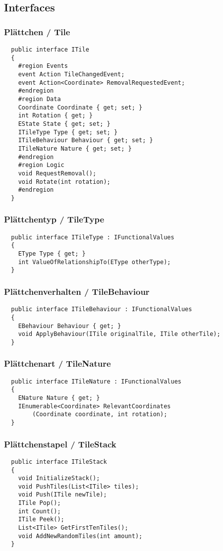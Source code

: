 \documentclass[../main.tex]{subfiles}
\begin{document}
	\subsection{Interfaces}
	\subsubsection{Plättchen / Tile}
	\begin{lstlisting}
  public interface ITile
  {
	#region Events
	event Action TileChangedEvent;
	event Action<Coordinate> RemovalRequestedEvent;
	#endregion
	#region Data
	Coordinate Coordinate { get; set; }
	int Rotation { get; }
	EState State { get; set; }
	ITileType Type { get; set; }
	ITileBehaviour Behaviour { get; set; }
	ITileNature Nature { get; set; }
	#endregion
	#region Logic
	void RequestRemoval();
	void Rotate(int rotation);
	#endregion
  }
	\end{lstlisting}

	\subsubsection{Plättchentyp / TileType}
	\begin{lstlisting}
  public interface ITileType : IFunctionalValues
  {
	EType Type { get; }
	int ValueOfRelationshipTo(EType otherType);
  }
	\end{lstlisting}

	\subsubsection{Plättchenverhalten / TileBehaviour}
	\begin{lstlisting}
  public interface ITileBehaviour : IFunctionalValues
  {
	EBehaviour Behaviour { get; }
	void ApplyBehaviour(ITile originalTile, ITile otherTile);
  }
	\end{lstlisting}

	\subsubsection{Plättchenart / TileNature}
	\begin{lstlisting}
  public interface ITileNature : IFunctionalValues
  {
	ENature Nature { get; }
	IEnumerable<Coordinate> RelevantCoordinates
		(Coordinate coordinate, int rotation);
  }
	\end{lstlisting}

	\subsubsection{Plättchenstapel / TileStack}
	\begin{lstlisting}
  public interface ITileStack
  {
	void InitializeStack();
	void PushTiles(List<ITile> tiles);
	void Push(ITile newTile);
	ITile Pop();
	int Count();
	ITile Peek();
	List<ITile> GetFirstTenTiles();
	void AddNewRandomTiles(int amount);
  }
	\end{lstlisting}
\end{document}
